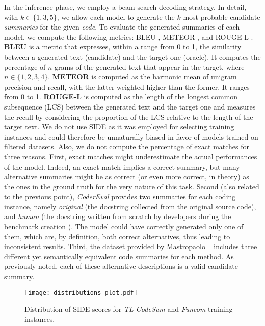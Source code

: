 In the inference phase, we employ a beam search decoding strategy. In detail, with $k \in \{1, 3, 5\}$, we allow each model to generate the $k$ most probable candidate \textit{summaries} for the given \textit{code}.
To evaluate the generated summaries of each model, we compute the following metrics: BLEU \cite{papineni2002bleu}, METEOR \cite{banerjee:acl2005}, and ROUGE-L \cite{lin2004rouge}.
\textbf{BLEU} is a metric that expresses, within a range from 0 to 1, the similarity between a generated text (candidate) and the target one (oracle). It computes the percentage of $n$-grams of the generated text that appear in the target, where $n \in \{1, 2, 3, 4\}$. 
\textbf{METEOR} is computed as the harmonic mean of unigram precision and recall, with the latter weighted higher than the former. It ranges from 0 to 1. 
\textbf{ROUGE-L} is computed as the length of the longest common subsequence (LCS) between the generated text and the target one and measures the recall by considering the proportion of the LCS relative to the length of the target text.
We do not use SIDE \cite{mastropaolo2024evaluating} as it was employed for selecting training instances and could therefore be unnaturally biased in favor of models trained on filtered datasets.
Also, we do not compute the percentage of exact matches for three reasons. First, exact matches might underestimate the actual performances of the model. Indeed, an exact match implies a correct summary, but many alternative summaries might be as correct (or even more correct, in theory) as the ones in the ground truth for the very nature of this task. Second (also related to the previous point), \textit{CoderEval} \cite{yu2024codereval} provides two summaries for each coding instance, namely \textit{original} (\ie the docstring collected from the original source code), and \textit{human} (\ie the docstring written from scratch by developers during the benchmark creation \cite{yu2024codereval}). The model could have correctly generated only one of them, which are, by definition, both correct alternatives, thus leading to inconsistent results. Third, the dataset provided by Mastropaolo \etal~\cite{mastropaolo2023robustness} includes three different yet semantically equivalent code summaries for each \java method. As previously noted, each of these alternative descriptions is a valid candidate summary.

\begin{figure}[t]
	\centering
	\texttt{[image: distributions-plot.pdf]}
	\caption{Distribution of SIDE scores for \textit{TL-CodeSum} and \textit{Funcom} training instances.}
	\label{fig:rq0_training_distribution}
\end{figure}

